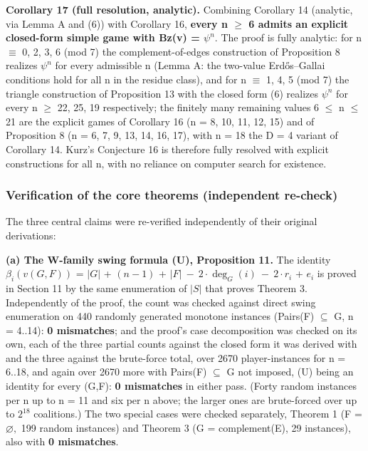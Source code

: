 \documentclass[
]{article}
\begin{document}
\textbf{Corollary 17 (full resolution, analytic).} Combining Corollary
14 (analytic, via Lemma A and (6)) with Corollary 16, \textbf{every n
\(\ge\) 6 admits an explicit closed-form simple game with Bz(v) =
\(\psi^n.\)} The proof is fully analytic: for n \(\equiv\) 0, 2, 3, 6
(mod 7) the complement-of-edges construction of Proposition 8 realizes
\(\psi^n\) for every admissible n (Lemma A: the two-value Erdős--Gallai
conditions hold for all n in the residue class), and for n \(\equiv\) 1,
4, 5 (mod 7) the triangle construction of Proposition 13 with the closed
form (6) realizes \(\psi^n\) for every n \(\ge\) 22, 25, 19
respectively; the finitely many remaining values 6 \(\le\) n \(\le\) 21
are the explicit games of Corollary 16 (n = 8, 10, 11, 12, 15) and of
Proposition 8 (n = 6, 7, 9, 13, 14, 16, 17), with n = 18 the D = 4
variant of Corollary 14. Kurz's Conjecture 16 is therefore fully
resolved with explicit constructions for all n, with no reliance on
computer search for existence.

\subsubsection{Verification of the core theorems (independent
re-check)}\label{verification-of-the-core-theorems-independent-re-check}

The three central claims were re-verified independently of their
original derivations:

\textbf{(a) The W-family swing formula (U), Proposition 11.} The
identity \(\beta_i(v(G,F))\) = \(\vert G\vert\) + \((n-1)\) +
\(\vert F\vert\ -\ 2\cdot\deg_G(i)\ -\ 2\cdot r_i\) + \(e_i\) is proved
in Section 11 by the same enumeration of \(|S|\) that proves Theorem 3.
Independently of the proof, the count was checked against direct swing
enumeration on 440 randomly generated monotone instances (Pairs(F)
\(\subseteq\) G, n = 4..14): \textbf{0 mismatches}; and the proof's case
decomposition was checked on its own, each of the three partial counts
against the closed form it was derived with and the three against the
brute-force total, over 2670 player-instances for n = 6..18, and again
over 2670 more with Pairs(F) \(\subseteq\) G not imposed, (U) being an
identity for every (G,F): \textbf{0 mismatches} in either pass. (Forty
random instances per n up to n = 11 and six per n above; the larger ones
are brute-forced over up to \(2^18\) coalitions.) The two special cases
were checked separately, Theorem 1 (F = \(\varnothing,\) 199 random
instances) and Theorem 3 (G = complement(E), 29 instances), also with
\textbf{0 mismatches}.
\end{document}
